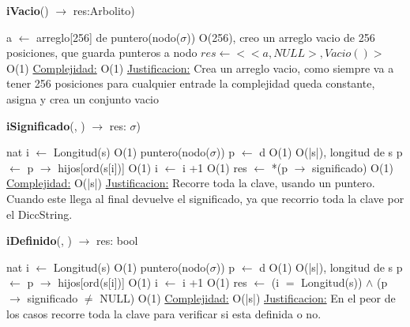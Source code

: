 \begin{Algoritmos}

\begin{algorithm}[H]{\textbf{iVacio}() $\to$ res:Arbolito)}
	\begin{algorithmic}[1]
		\State a $\gets$ arreglo[256] de puntero(nodo($\sigma$)) \Comment O(256), creo un arreglo vacio de 256 posiciones, que guarda punteros a nodo
		\State $res \gets <<a, NULL>, Vacio()>$ \Comment O(1)
		\medskip
		\Statex \underline{Complejidad:} O(1)
			\Statex \underline{Justificacion:} Crea un arreglo vacio, como siempre va a tener 256 posiciones para cualquier entrade la complejidad queda constante, asigna y crea un conjunto vacio
	\end{algorithmic}
\end{algorithm}


\begin{algorithm}[H]{\textbf{iSignificado}(, ) $\to$ res: $\sigma$)}
	\begin{algorithmic}[1]
		\State nat i $\gets$ Longitud(s) \Comment O(1)
		\State puntero(nodo($\sigma$)) p $\gets$ d \Comment O(1)
		 \Comment O(|s|), longitud de s
			\State p $\gets$ p $\to$ hijos[ord(s[i])] \Comment O(1)
		 	\State i $\gets$ i +1 \Comment O(1)
		 \EndWhile
		 \State res $\gets$ *(p $\to$ significado) \Comment O(1)
		\medskip
		\Statex \underline{Complejidad:} O(|s|)
			\Statex \underline{Justificacion:} Recorre toda la clave, usando un puntero. Cuando este llega al final devuelve el significado, ya que recorrio toda la clave por el DiccString.  
	\end{algorithmic}
\end{algorithm}

\begin{algorithm}[H]{\textbf{iDefinido}(, ) $\to$ res: bool}
	\begin{algorithmic}[1]
		\State nat i $\gets$ Longitud(s) \Comment O(1)
		\State puntero(nodo($\sigma$)) p $\gets$ d \Comment O(1)
		 \Comment O(|s|), longitud de s
			\State p $\gets$ p $\to$ hijos[ord(s[i])] \Comment O(1)
		 	\State i $\gets$ i +1 \Comment O(1)
		 \EndWhile
		 \State res $\gets$ (i $=$ Longitud(s)) $\wedge$ (p$\to$ significado $\neq$ NULL) \Comment O(1)
		\medskip
		\Statex \underline{Complejidad:} O(|s|)
			\Statex \underline{Justificacion:} En el peor de los casos recorre toda la clave para verificar si esta definida o no.  
	\end{algorithmic}
\end{algorithm}


\end{Algoritmos}
